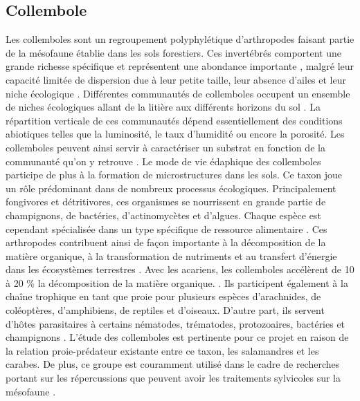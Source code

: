 \subsection*{Collembole}

Les collemboles sont un regroupement polyphylétique d'arthropodes faisant partie de la mésofaune établie dans les sols forestiers.
Ces invertébrés comportent une grande richesse spécifique et représentent une abondance importante \citep{rusekBiodiversityCollembolaTheir1998}, 
malgré leur capacité limitée de dispersion due à leur petite taille, leur absence d’ailes et leur niche écologique \citep{Ojala2001Dispersalmicroarthropods}.
Différentes communautés de collemboles occupent un ensemble de niches écologiques allant de la litière aux différents horizons du sol \citep{pongeVerticalDistributionCollembola2000}.
La répartition verticale de ces communautés dépend essentiellement des conditions abiotiques telles que la luminosité, le taux d’humidité ou encore la porosité.
Les collemboles peuvent ainsi servir à caractériser un substrat en fonction de la communauté qu’on y retrouve \citep{rusekBiodiversityCollembolaTheir1998}.
Le mode de vie édaphique des collemboles participe de plus à la formation de microstructures dans les sols.
Ce taxon joue un rôle prédominant dans de nombreux processus écologiques. 
Principalement fongivores et détritivores, ces organismes se nourrissent en grande partie de champignons, de bactéries, d'actinomycètes et d'algues. 
Chaque espèce est cependant spécialisée dans un type spécifique de ressource alimentaire \citep{Chen1995Foodpreference,rusekBiodiversityCollembolaTheir1998}.
Ces arthropodes contribuent ainsi de façon importante à la décomposition de la matière organique, à la transformation de nutriments et 
au transfert d’énergie dans les écosystèmes terrestres \citep{Cuchta2019importantrole,Hattenschwiler2005Biodiversitylitter,Marsden2020Howagroforestry,Petersen2000Collembolapopulations,rusekBiodiversityCollembolaTheir1998,Wolters1991SoilInvertebrates}.
Avec les acariens, les collemboles accélèrent de 10 à 20 \% la décomposition de la matière organique. \citep{Hattenschwiler2005Biodiversitylitter}.
Ils participent également à la chaîne trophique en tant que proie pour plusieurs espèces d’arachnides, de coléoptères, d’amphibiens, 
de reptiles et d’oiseaux. 
D'autre part, ils servent d’hôtes parasitaires à certains nématodes, trématodes, protozoaires, bactéries et champignons \citep{rusekBiodiversityCollembolaTheir1998}.
L'étude des collemboles est pertinente pour ce projet en raison de la relation proie-prédateur existante entre ce taxon, les salamandres et les carabes. 
De plus, ce groupe est couramment utilisé dans le cadre de recherches portant sur les répercussions que peuvent avoir les traitements sylvicoles sur la mésofaune \citep{farskaManagementIntensityAffects2014,rousseauWoodyBiomassRemoval2019,Salmon2008Relationshipssoil}.

